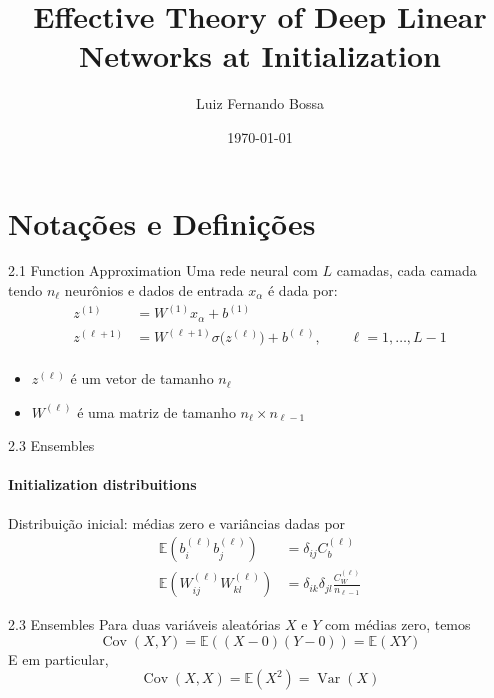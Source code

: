 \documentclass{beamer}
\title{Effective Theory of Deep Linear Networks at Initialization}
\author{Luiz Fernando Bossa}
\date{\today}
\institute{Universidade Federal de Santa Catarina}
\newcommand{\EE}{\mathbb{E}}
\DeclareMathOperator{\Cov}{Cov}
\DeclareMathOperator{\Var}{Var}
\begin{document}
{ 
\frame{\titlepage}}
\frame{\tableofcontents}


\section{Notações e Definições}    
\begin{frame}
\tableofcontents[currentsection]
\end{frame}


\begin{frame}{2.1 Function Approximation}
Uma rede neural com $L$ camadas, cada camada tendo $n_\ell$ neurônios e dados de entrada $x_\alpha$ é dada por:
\begin{align*}
	z^{(1)} &= W^{(1)} x_\alpha + b^{(1)}  \\\tag{2.5}\label{eq:NN}
	z^{(\ell+1)} &= W^{(\ell+1)} \sigma\big(z^{(\ell)}\big) + b^{(\ell)}, \qquad \ell = 1, \ldots, L-1 \\
\end{align*}
\begin{itemize}
	\item $z^{(\ell)}$ é um vetor de tamanho $n_\ell$ 
	\item $W^{(\ell)}$ é uma matriz de tamanho $n_\ell \times n_{\ell-1}$
\end{itemize}


\end{frame}
 
\begin{frame}{2.3 Ensembles}
	\framesubtitle{Initialization distribuitions}
	Distribuição inicial: médias zero e variâncias dadas por
	\begin{align*}
		\EE\left(b^{(\ell)}_{i}b^{(\ell)}_j\right) &= \delta_{ij}C_b^{(\ell)}  \tag{2.19}\\
		\EE\left(W^{(\ell)}_{ij}W^{(\ell)}_{kl}\right) &= \delta_{ik}\delta_{jl}\frac{C_W^{(\ell)}}{n_{\ell-1}} \tag{2.20}	\end{align*}
\end{frame}


\begin{frame}{2.3 Ensembles}
	Para duas variáveis aleatórias $X$ e $Y$ com médias zero, temos 
	$$\Cov(X,Y) = \EE((X-0)(Y-0)) = \EE(XY)$$
	E em particular, 
	$$\Cov(X,X) = \EE(X^2) = \Var(X)$$
\end{frame}
\end{document}
